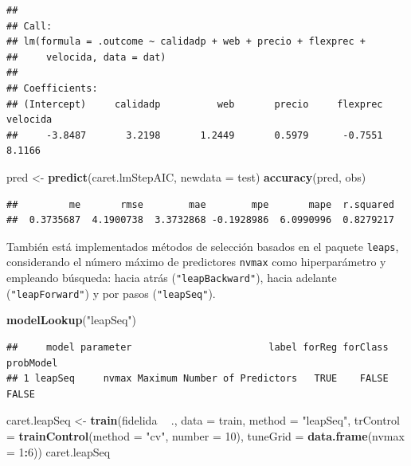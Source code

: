 \documentclass[
]{book}
\newenvironment{Shaded}{\begin{snugshade}}{\end{snugshade}}
\newcommand{\DataTypeTok}[1]{\textcolor[rgb]{0.13,0.29,0.53}{#1}}
\newcommand{\DecValTok}[1]{\textcolor[rgb]{0.00,0.00,0.81}{#1}}
\newcommand{\KeywordTok}[1]{\textcolor[rgb]{0.13,0.29,0.53}{\textbf{#1}}}
\newcommand{\NormalTok}[1]{#1}
\newcommand{\OperatorTok}[1]{\textcolor[rgb]{0.81,0.36,0.00}{\textbf{#1}}}
\newcommand{\StringTok}[1]{\textcolor[rgb]{0.31,0.60,0.02}{#1}}
\theoremstyle{break}
\theoremstyle{definition}
\theoremstyle{definition}
\theoremstyle{definition}
\theoremstyle{remark}
\begin{document}
\begin{verbatim}
## 
## Call:
## lm(formula = .outcome ~ calidadp + web + precio + flexprec + 
##     velocida, data = dat)
## 
## Coefficients:
## (Intercept)     calidadp          web       precio     flexprec     velocida  
##     -3.8487       3.2198       1.2449       0.5979      -0.7551       8.1166
\end{verbatim}

\begin{Shaded}
\begin{Highlighting}[]
\NormalTok{pred <-}\StringTok{ }\KeywordTok{predict}\NormalTok{(caret.lmStepAIC, }\DataTypeTok{newdata =}\NormalTok{ test)}
\KeywordTok{accuracy}\NormalTok{(pred, obs)}
\end{Highlighting}
\end{Shaded}

\begin{verbatim}
##         me       rmse        mae        mpe       mape  r.squared 
##  0.3735687  4.1900738  3.3732868 -0.1928986  6.0990996  0.8279217
\end{verbatim}

También está implementados métodos de selección basados en el paquete \texttt{leaps}, considerando el número máximo de predictores \texttt{nvmax} como hiperparámetro y empleando búsqueda: hacia atrás (\texttt{"leapBackward"}), hacia adelante (\texttt{"leapForward"}) y por pasos (\texttt{"leapSeq"}).

\begin{Shaded}
\begin{Highlighting}[]
\KeywordTok{modelLookup}\NormalTok{(}\StringTok{"leapSeq"}\NormalTok{)}
\end{Highlighting}
\end{Shaded}

\begin{verbatim}
##     model parameter                        label forReg forClass probModel
## 1 leapSeq     nvmax Maximum Number of Predictors   TRUE    FALSE     FALSE
\end{verbatim}

\begin{Shaded}
\begin{Highlighting}[]
\NormalTok{caret.leapSeq <-}\StringTok{ }\KeywordTok{train}\NormalTok{(fidelida }\OperatorTok{~}\StringTok{ }\NormalTok{., }\DataTypeTok{data =}\NormalTok{ train, }\DataTypeTok{method =} \StringTok{"leapSeq"}\NormalTok{,}
                   \DataTypeTok{trControl =} \KeywordTok{trainControl}\NormalTok{(}\DataTypeTok{method =} \StringTok{"cv"}\NormalTok{, }\DataTypeTok{number =} \DecValTok{10}\NormalTok{),}
                   \DataTypeTok{tuneGrid =} \KeywordTok{data.frame}\NormalTok{(}\DataTypeTok{nvmax =} \DecValTok{1}\OperatorTok{:}\DecValTok{6}\NormalTok{))}
\NormalTok{caret.leapSeq}
\end{Highlighting}
\end{Shaded}
\end{document}
